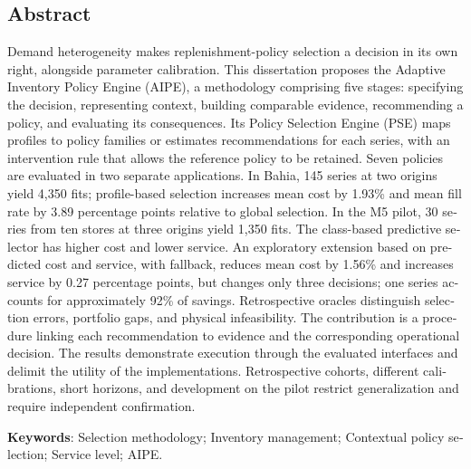 \begin{otherlanguage}{english}
\chapter*{\centering Abstract}
Demand heterogeneity makes replenishment-policy selection a decision in its own right, alongside parameter calibration. This dissertation proposes the Adaptive Inventory Policy Engine (AIPE), a methodology comprising five stages: specifying the decision, representing context, building comparable evidence, recommending a policy, and evaluating its consequences. Its Policy Selection Engine (PSE) maps profiles to policy families or estimates recommendations for each series, with an intervention rule that allows the reference policy to be retained. Seven policies are evaluated in two separate applications. In Bahia, 145 series at two origins yield 4,350 fits; profile-based selection increases mean cost by 1.93\% and mean fill rate by 3.89 percentage points relative to global selection. In the M5 pilot, 30 series from ten stores at three origins yield 1,350 fits. The class-based predictive selector has higher cost and lower service. An exploratory extension based on predicted cost and service, with fallback, reduces mean cost by 1.56\% and increases service by 0.27 percentage points, but changes only three decisions; one series accounts for approximately 92\% of savings. Retrospective oracles distinguish selection errors, portfolio gaps, and physical infeasibility. The contribution is a procedure linking each recommendation to evidence and the corresponding operational decision. The results demonstrate execution through the evaluated interfaces and delimit the utility of the implementations. Retrospective cohorts, different calibrations, short horizons, and development on the pilot restrict generalization and require independent confirmation.

\vspace{2em}
\textbf{Keywords}: Selection methodology; Inventory management; Contextual policy selection; Service level; AIPE.
\end{otherlanguage}
